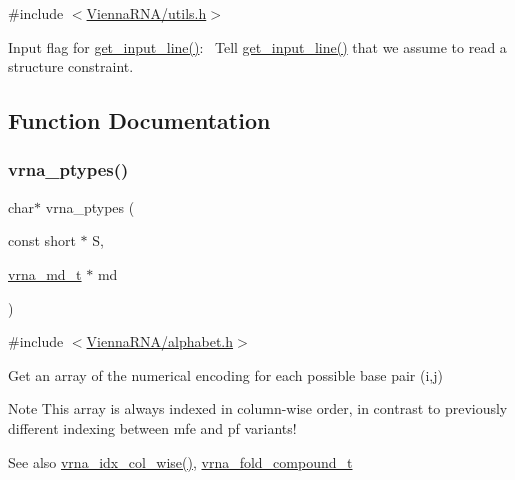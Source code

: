 {\ttfamily \#include $<$\hyperlink{utils_8h}{Vienna\+R\+N\+A/utils.\+h}$>$}



Input flag for \hyperlink{group__utils_ga8ef1835eb83f542396f59f0b205965e5}{get\+\_\+input\+\_\+line()}\+:~\newline
Tell \hyperlink{group__utils_ga8ef1835eb83f542396f59f0b205965e5}{get\+\_\+input\+\_\+line()} that we assume to read a structure constraint. 



\subsection{Function Documentation}
\mbox{\label{group__utils_ga51a9e86a5f731f5f2f5584ee67cee4a8}} 
\subsubsection{\texorpdfstring{vrna\+\_\+ptypes()}{vrna\_ptypes()}}
{\footnotesize\ttfamily char$\ast$ vrna\+\_\+ptypes (\begin{DoxyParamCaption}\item[{const short $\ast$}]{S,  }\item[{\hyperlink{group__model__details_ga1f8a10e12a0a1915f2a4eff0b28ea17c}{vrna\+\_\+md\+\_\+t} $\ast$}]{md }\end{DoxyParamCaption})}



{\ttfamily \#include $<$\hyperlink{alphabet_8h}{Vienna\+R\+N\+A/alphabet.\+h}$>$}



Get an array of the numerical encoding for each possible base pair (i,j) 

\begin{DoxyNote}{Note}
This array is always indexed in column-\/wise order, in contrast to previously different indexing between mfe and pf variants!
\end{DoxyNote}
\begin{DoxySeeAlso}{See also}
\hyperlink{group__utils_ga89ebc69c52fa0c78c9e1974b0017746b}{vrna\+\_\+idx\+\_\+col\+\_\+wise()}, \hyperlink{group__fold__compound_ga1b0cef17fd40466cef5968eaeeff6166}{vrna\+\_\+fold\+\_\+compound\+\_\+t} 
\end{DoxySeeAlso}
\mbox{\label{group__utils_gac12bf00123f88621c9be847b0879c1fb}} 
